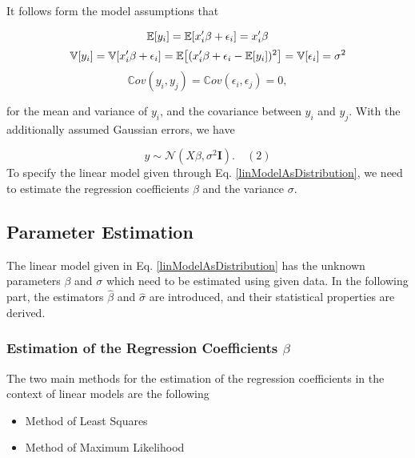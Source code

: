 \documentclass[10pt,a4paper]{article}
\begin{document}
	It follows form the model assumptions that 
	
	\begin{equation}
	\mathbb E[y_i] = \mathbb E [x_i'\beta + \epsilon_i] = x_i'\beta \\
	\end{equation}
	\begin{equation}
	\mathbb V[y_i] = \mathbb V[x_i'\beta + \epsilon_i] = \mathbb{E}\big[(x_i'\beta + \epsilon_i - \mathbb{E}[y_i])^2\big] = \mathbb V[\epsilon_i] = \sigma^2 \\
	\end{equation}
	\begin{equation}
	\mathbb Cov(y_i, y_j) = \mathbb Cov(\epsilon_i, \epsilon_j) = 0, 
	\end{equation}
	

	
	
	for the mean and variance of $y_i$, and the covariance between $y_i$ and $y_j$. With the additionally assumed Gaussian errors, we have
	
	\begin{equation} \label{linModelAsDistribution}
	y \sim \mathcal N(X\beta, \sigma^2\mathbf I). \quad (2)
	\end{equation}
	To specify the linear model given through Eq. \ref{linModelAsDistribution}, we need to estimate the regression coefficients $\beta$ and the variance $\sigma$.
	
	
	\subsection{Parameter Estimation}
	
	The linear model given in Eq. \ref{linModelAsDistribution} has the unknown parameters $\beta$ and $\sigma$ which need to be estimated using given data. In the following part, the estimators $\hat \beta$ and $\hat \sigma$ are introduced, and their statistical properties are derived. 
	
	\subsubsection{Estimation of the Regression Coefficients $\beta$}
	
	The two main methods for the estimation of the regression coefficients in the context of linear models are the following
	
	\begin{itemize}
		\item Method of Least Squares
		\item Method of Maximum Likelihood
	\end{itemize}	
	
\end{document}
